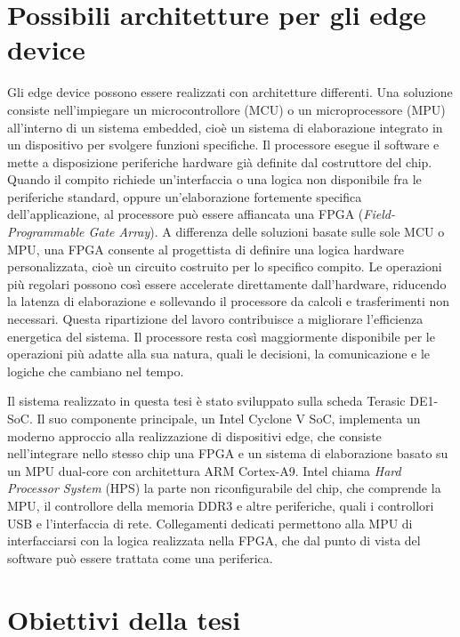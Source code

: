\section{Possibili architetture per gli edge device}

Gli edge device possono essere realizzati con architetture differenti. Una soluzione consiste nell'impiegare un microcontrollore (MCU) o un microprocessore (MPU) all'interno di un sistema embedded, cioè un sistema di elaborazione integrato in un dispositivo per svolgere funzioni specifiche. Il processore esegue il software e mette a disposizione periferiche hardware già definite dal costruttore del chip. Quando il compito richiede un'interfaccia o una logica non disponibile fra le periferiche standard, oppure un'elaborazione fortemente specifica dell'applicazione, al processore può essere affiancata una FPGA (\emph{Field-Programmable Gate Array}). A differenza delle soluzioni basate sulle sole MCU o MPU, una FPGA consente al progettista di definire una logica hardware personalizzata, cioè un circuito costruito per lo specifico compito. Le operazioni più regolari possono così essere accelerate direttamente dall'hardware, riducendo la latenza di elaborazione e sollevando il processore da calcoli e trasferimenti non necessari. Questa ripartizione del lavoro contribuisce a migliorare l'efficienza energetica del sistema. Il processore resta così maggiormente disponibile per le operazioni più adatte alla sua natura, quali le decisioni, la comunicazione e le logiche che cambiano nel tempo.

Il sistema realizzato in questa tesi è stato sviluppato sulla scheda Terasic DE1-SoC. Il suo componente principale, un Intel Cyclone V SoC, implementa un moderno approccio alla realizzazione di dispositivi edge, che consiste nell'integrare nello stesso chip una FPGA e un sistema di elaborazione basato su un MPU dual-core con architettura ARM Cortex-A9. Intel chiama \emph{Hard Processor System} (HPS) la parte non riconfigurabile del chip, che comprende la MPU, il controllore della memoria DDR3 e altre periferiche, quali i controllori USB e l'interfaccia di rete. Collegamenti dedicati permettono alla MPU di interfacciarsi con la logica realizzata nella FPGA, che dal punto di vista del software può essere trattata come una periferica.

\section{Obiettivi della tesi}

